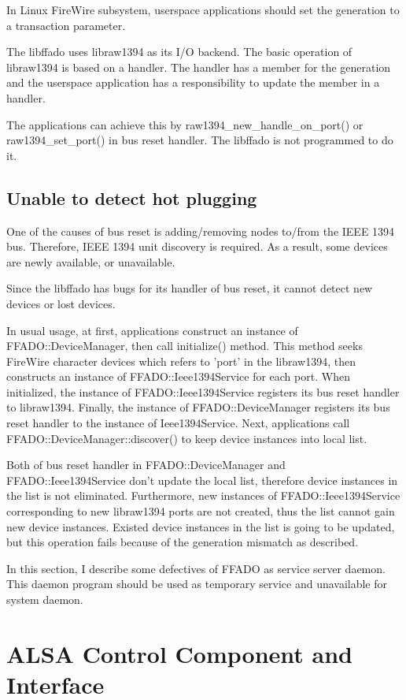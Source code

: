 \documentclass[onecolumn]{article}
\begin{document}
In Linux FireWire subsystem, userspace applications should set the generation to a transaction parameter.

The libffado uses libraw1394 as its I/O backend. The basic operation of libraw1394 is based on a handler. The handler has a member for the generation and the userspace application has a responsibility to update the member in a handler.

The applications can achieve this by raw1394\_new\_handle\_on\_port() or raw1394\_set\_port() in bus reset handler. The libffado is not programmed to do it.


\subsection{Unable to detect hot plugging}

One of the causes of bus reset is adding/removing nodes to/from the IEEE 1394 bus. Therefore, IEEE 1394 unit discovery is required. As a result, some devices are newly available, or unavailable.

Since the libffado has bugs for its handler of bus reset, it cannot detect new devices or lost devices.

In usual usage, at first, applications construct an instance of FFADO::DeviceManager, then call initialize() method. This method seeks FireWire character devices which refers to 'port' in the libraw1394, then constructs an instance of FFADO::Ieee1394Service for each port. When initialized, the instance of FFADO::Ieee1394Service registers its bus reset handler to libraw1394. Finally, the instance of FFADO::DeviceManager registers its bus reset handler to the instance of Ieee1394Service. Next, applications call FFADO::DeviceManager::discover() to keep device instances into local list.

Both of bus reset handler in FFADO::DeviceManager and FFADO::Ieee1394Service don't update the local list, therefore device instances in the list is not eliminated. Furthermore, new instances of FFADO::Ieee1394Service corresponding to new libraw1394 ports are not created, thus the list cannot gain new device instances. Existed device instances in the list is going to be updated, but this operation fails because of the generation mismatch as described.


In this section, I describe some defectives of FFADO as service server daemon. This daemon program should be used as temporary service and unavailable for system daemon.


\section{ALSA Control Component and Interface}
\end{document}
